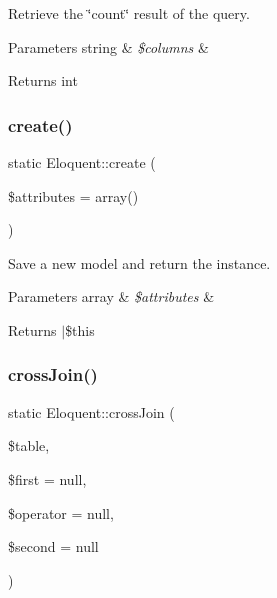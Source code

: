 Retrieve the \char`\"{}count\char`\"{} result of the query.


\begin{DoxyParams}[1]{Parameters}
string & {\em \$columns} & \\
\hline
\end{DoxyParams}
\begin{DoxyReturn}{Returns}
int 
\end{DoxyReturn}
\mbox{\label{class_eloquent_af00cc719bafb53826d7adb0a4e79ed07}} 
\subsubsection{\texorpdfstring{create()}{create()}}
{\footnotesize\ttfamily static Eloquent\+::create (\begin{DoxyParamCaption}\item[{}]{\$attributes = {\ttfamily array()} }\end{DoxyParamCaption})\hspace{0.3cm}{\ttfamily [static]}}

Save a new model and return the instance.


\begin{DoxyParams}[1]{Parameters}
array & {\em \$attributes} & \\
\hline
\end{DoxyParams}
\begin{DoxyReturn}{Returns}
$\vert$\$this 
\end{DoxyReturn}
\mbox{\label{class_eloquent_a8a23e4c7ff6e59bf6a8337018dcf1063}} 
\subsubsection{\texorpdfstring{cross\+Join()}{crossJoin()}}
{\footnotesize\ttfamily static Eloquent\+::cross\+Join (\begin{DoxyParamCaption}\item[{}]{\$table,  }\item[{}]{\$first = {\ttfamily null},  }\item[{}]{\$operator = {\ttfamily null},  }\item[{}]{\$second = {\ttfamily null} }\end{DoxyParamCaption})\hspace{0.3cm}{\ttfamily [static]}}

